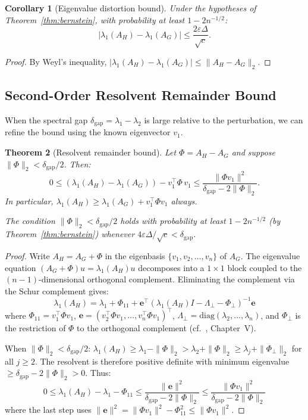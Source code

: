 \documentclass[11pt]{article}
\newtheorem{theorem}{Theorem}[section]
\newtheorem{corollary}[theorem]{Corollary}
\theoremstyle{definition}
\newcommand{\eps}{\varepsilon}
\newcommand{\lamH}{\lambda_1(A_H)}
\newcommand{\lamG}{\lambda_1(A_G)}
\newcommand{\AG}{A_G}
\newcommand{\AH}{A_H}
\newcommand{\vone}{v_1}
\begin{document}
\begin{corollary}[Eigenvalue distortion bound]\label{cor:weyl}
Under the hypotheses of Theorem~\ref{thm:bernstein}, with probability at least
$1 - 2n^{-1/2}$:
\[
|\lamH - \lamG| \leq \frac{2\eps\Delta}{\sqrt{c}}.
\]
\end{corollary}
\begin{proof}
By Weyl's inequality, $|\lamH - \lamG| \leq \|\AH - \AG\|_2$.
\end{proof}

\subsection{Second-Order Resolvent Remainder Bound}

When the spectral gap $\delta_{\mathrm{gap}} = \lambda_1 - \lambda_2$ is large
relative to the perturbation, we can refine the bound using the known eigenvector $\vone$.

\begin{theorem}[Resolvent remainder bound]\label{thm:resolvent}
Let $\Phi = \AH - \AG$ and suppose $\|\Phi\|_2 < \delta_{\mathrm{gap}}/2$. Then:
\[
0 \leq (\lamH - \lamG) - \vone^\top \Phi\, \vone
\leq \frac{\|\Phi\vone\|^2}{\delta_{\mathrm{gap}} - 2\|\Phi\|_2}.
\]
In particular, $\lamH \geq \lamG + \vone^\top \Phi\vone$ always.

The condition $\|\Phi\|_2 < \delta_{\mathrm{gap}}/2$ holds with probability at least
$1 - 2n^{-1/2}$ (by Theorem~\ref{thm:bernstein}) whenever
$4\eps\Delta/\sqrt{c} < \delta_{\mathrm{gap}}$.
\end{theorem}

\begin{proof}
Write $\AH = \AG + \Phi$ in the eigenbasis $\{\vone, v_2, \ldots, v_n\}$ of $\AG$.
The eigenvalue equation $(\AG + \Phi)u = \lamH u$ decomposes into
a $1 \times 1$ block coupled to the $(n-1)$-dimensional
orthogonal complement. Eliminating the complement via the Schur complement gives:
\[
\lamH = \lambda_1 + \Phi_{11} + \mathbf{e}^\top\!
\left(\lamH I - \Lambda_\perp - \Phi_\perp\right)^{-1}\!\mathbf{e}
\]
where $\Phi_{11} = \vone^\top \Phi \vone$,
$\mathbf{e} = (v_2^\top \Phi\vone, \ldots, v_n^\top \Phi\vone)^\top$,
$\Lambda_\perp = \mathrm{diag}(\lambda_2, \ldots, \lambda_n)$,
and $\Phi_\perp$ is the restriction of $\Phi$ to the orthogonal complement
(cf.~\citet{stewart1990matrix}, Chapter~V).

When $\|\Phi\|_2 < \delta_{\mathrm{gap}}/2$:
$\lamH \geq \lambda_1 - \|\Phi\|_2 > \lambda_2 + \|\Phi\|_2 \geq \lambda_j + \|\Phi_\perp\|_2$
for all $j \geq 2$. The resolvent is therefore positive definite with minimum
eigenvalue $\geq \delta_{\mathrm{gap}} - 2\|\Phi\|_2 > 0$.
Thus:
\[
0 \leq \lamH - \lambda_1 - \Phi_{11}
\leq \frac{\|\mathbf{e}\|^2}{\delta_{\mathrm{gap}} - 2\|\Phi\|_2}
\leq \frac{\|\Phi\vone\|^2}{\delta_{\mathrm{gap}} - 2\|\Phi\|_2}
\]
where the last step uses $\|\mathbf{e}\|^2 = \|\Phi\vone\|^2 - \Phi_{11}^2 \leq \|\Phi\vone\|^2$.
\end{proof}
\end{document}

